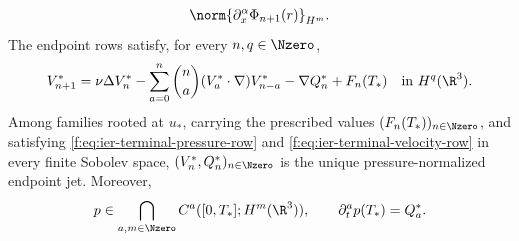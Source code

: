 \begin{theorem}
\begin{align}
 \norm{\partial_x^\alpha\Phi_{n+1}(r)}_{H^m}.
 \label{f:eq:ier-terminal-mixed-pressure-modulus}
\end{align}
The endpoint rows satisfy, for every \(n,q\in\Nzero\),
\begin{equation}
 V_{n+1}^*
 =\nu\Delta V_n^*
 -\sum_{a=0}^{n}\binom na(V_a^*\cdot\nabla)V_{n-a}^*
 -\nabla Q_n^*+F_n(T_*)
 \quad\text{in }H^q(\R^3).
 \label{f:eq:ier-terminal-velocity-row}
\end{equation}
Among families rooted at \(u_*\), carrying the prescribed values
\((F_n(T_*))_{n\in\Nzero}\), and satisfying
\eqref{f:eq:ier-terminal-pressure-row} and
\eqref{f:eq:ier-terminal-velocity-row} in every finite Sobolev space,
\((V_n^*,Q_n^*)_{n\in\Nzero}\) is the unique pressure-normalized endpoint
jet.  Moreover,
\begin{equation}
 p\in\bigcap_{a,m\in\Nzero}C^a([0,T_*];H^m(\R^3)),
 \qquad
 \partial_t^ap(T_*)=Q_a^*.
 \label{f:eq:ier-complete-left-pressure-jet}
\end{equation}
\end{theorem}

